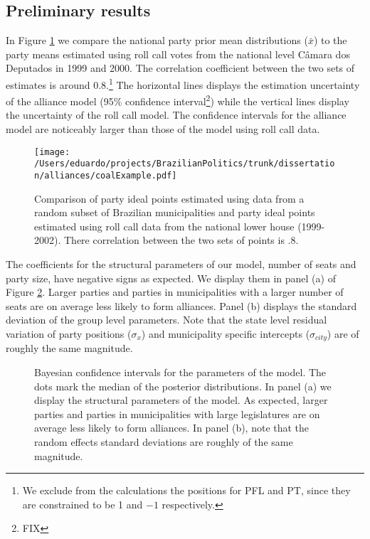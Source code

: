 \subsection{Preliminary results}

In Figure \ref{fig:mu} we compare the national party prior mean distributions ($\bar x$) to the party means estimated using roll call votes from the national level Câmara dos Deputados in 1999 and 2000.    The correlation coefficient between the two sets of estimates is around $0.8$.\footnote{We exclude from the calculations the positions for PFL and PT, since they are constrained to be 1 and $-1$ respectively.} The horizontal lines displays the estimation uncertainty of the alliance model (95\% confidence interval\footnote{FIX}) while the vertical lines  display the uncertainty of the roll call model. The confidence intervals for the alliance model are noticeably larger than those of the model using roll call data.   


\begin{figure}
  \centering
  \texttt{[image: /Users/eduardo/projects/BrazilianPolitics/trunk/dissertation/alliances/coalExample.pdf]}
  \caption{Comparison of party ideal points estimated using data from a random subset of Brazilian municipalities and party ideal points estimated using roll call data from the national lower house (1999-2002). There correlation between the two sets of points is $.8$.}
  \label{fig:mu}
\end{figure}


The coefficients for the structural parameters of our model, number of seats and party size, have negative signs as expected. We display them in panel (a) of  Figure \ref{fig:coefs}. Larger parties and parties in municipalities with a larger number of seats are on average less likely to form alliances.  Panel (b) displays the standard deviation of the group level parameters. Note that the state level residual variation of party positions ($\sigma_x$) and municipality specific intercepts ($\sigma_{city}$)  are of roughly the same magnitude.   


\begin{figure}
  \caption{Bayesian confidence intervals for the parameters of the model. The dots mark the median of the posterior distributions. In panel (a) we display the structural parameters of the model. As expected, larger parties and parties in municipalities with large legislatures are on average less likely to form alliances. In panel (b), note that the random effects standard deviations are roughly of the same magnitude.  }
  \label{fig:coefs}
  \end{figure}  



